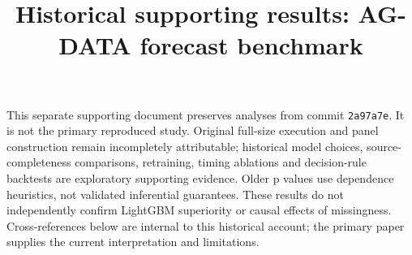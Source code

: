 \documentclass[11pt]{article}
\title{Historical supporting results: AG-DATA forecast benchmark}
\author{}\date{}
\begin{document}
\maketitle
\noindent This separate supporting document preserves analyses from commit \texttt{2a97a7e}. It is not the primary reproduced study. Original full-size execution and panel construction remain incompletely attributable; historical model choices, source-completeness comparisons, retraining, timing ablations and decision-rule backtests are exploratory supporting evidence. Older p values use dependence heuristics, not validated inferential guarantees. These results do not independently confirm LightGBM superiority or causal effects of missingness. Cross-references below are internal to this historical account; the primary paper supplies the current interpretation and limitations.









\end{document}
